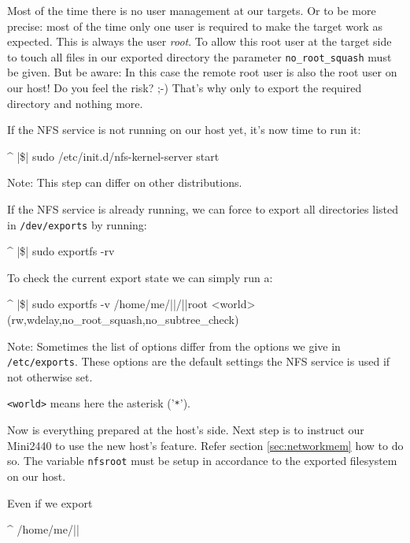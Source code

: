 Most of the time there is no user management at our targets. Or to be more precise: most of
the time only one user is required to make the target work as expected. This is always the
user \textit{root}. To allow this root user at the target side to touch all files in our exported
directory the parameter \texttt{no\_root\_squash} must be given. But be aware: In this
case the remote root user is also the root user on our host! Do you feel the risk? ;-) That's why
only to export the required directory and nothing more.

If the NFS service is not running on our host yet, it's now time to run it:

\begin{ptxshell}[escapechar=|]{^}
|\$| sudo /etc/init.d/nfs-kernel-server start
\end{ptxshell}

Note: This step can differ on other distributions.

If the NFS service is already running, we can force to export all directories listed in
\texttt{/dev/exports} by running:

\begin{ptxshell}[escapechar=|]{^}
|\$| sudo exportfs -rv
\end{ptxshell}

To check the current export state we can simply run a:

\begin{ptxshell}[escapechar=|]{^}
|\$| sudo exportfs -v
/home/me/|\ptxdistBSPName |/|\ptxdistPlatformDir |root
	<world>(rw,wdelay,no_root_squash,no_subtree_check)
\end{ptxshell}

Note: Sometimes the list of options differ from the options we give in
\texttt{/etc/exports}. These options are the default settings the NFS service
is used if not otherwise set.

\texttt{<world>} means here the asterisk ('\texttt{*}').

Now is everything prepared at the host's side. Next step is to instruct our
Mini2440 to use the new host's feature. Refer section \ref{sec:networkmem} how
to do so. The variable \texttt{nfsroot} must be setup in accordance to the
exported filesystem on our host.

Even if we export

\begin{ptxshell}[escapechar=|]{^}
/home/me/|\ptxdistBSPName |
\end{ptxshell}

